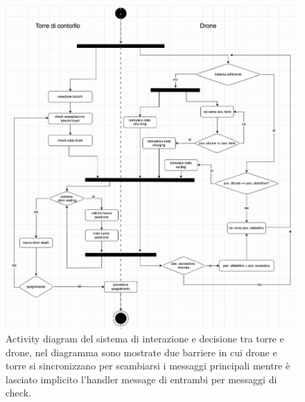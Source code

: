 \documentclass[a4paper, 11pt]{article}
\begin{document}
\begin{figure}[H]
    \centering
    \includegraphics[height = 17 cm]{image/activityDiagram.png}
    \caption{Activity diagram del sistema di interazione e decisione tra torre e drone, nel diagramma sono mostrate due barriere in cui drone e torre si sincronizzano per scambiarsi i messaggi principali mentre è lasciato implicito l'handler message di entrambi per messaggi di check.}
    
\end{figure}


\newpage
\end{document}
